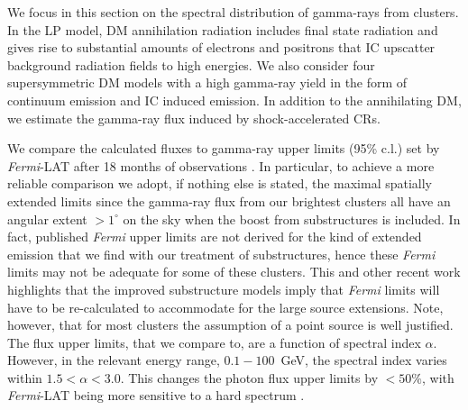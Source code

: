 \documentclass[10pt,aps,pra,reprint,amsmath,amsfonts,amssymb,showpacs,nofootinbib,floatfix]{revtex4-1}
\newcommand{\Fermi}{{\em Fermi}\xspace}
\begin{document}
We focus in this section on the spectral distribution of gamma-rays
from clusters. In the LP model, DM annihilation radiation includes
final state radiation and gives rise to substantial amounts of
electrons and positrons that IC upscatter background radiation fields
to high energies. We also consider four supersymmetric DM models with
a high gamma-ray yield in the form of continuum emission and IC
induced emission. In addition to the annihilating DM, we estimate the
gamma-ray flux induced by shock-accelerated CRs.

We compare the calculated fluxes to gamma-ray upper limits (95\% c.l.)
set by \Fermi-LAT after 18 months of observations
\cite{2010ApJ...717L..71A}. In particular, to achieve a more reliable
comparison we adopt, if nothing else is stated, the maximal spatially
extended limits since the gamma-ray flux from our brightest clusters
all have an angular extent $>1^\circ$ on the sky when the boost from
substructures is included. In fact, published \Fermi upper limits are
not derived for the kind of extended emission that we find with our
treatment of substructures, hence these \Fermi limits may not be
adequate for some of these clusters. This and other recent work
highlights that the improved substructure models imply that \Fermi
limits will have to be re-calculated to accommodate for the large
source extensions. Note, however, that for most clusters the
assumption of a point source is well justified.  The flux upper
limits, that we compare to, are a function of spectral index
$\alpha$. However, in the relevant energy range, $0.1-100$~GeV, the
spectral index varies within $1.5 < \alpha < 3.0$. This changes the
photon flux upper limits by $<50\%$, with \Fermi-LAT being more
sensitive to a hard spectrum \cite{2010ApJ...717L..71A}.
\end{document}
